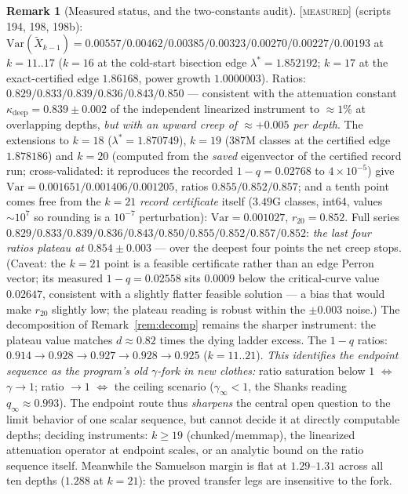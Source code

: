 \documentclass[11pt]{article}
\theoremstyle{definition}
\newtheorem{remark}[theorem]{Remark}
\newcommand{\MEASURED}{\textup{[\textsc{measured}]}}
\newcommand{\Var}{\mathrm{Var}}
\newcommand{\lam}{\lambda}
\begin{document}
\begin{remark}[Measured status, and the two-constants audit]
\label{rem:twoconstants}
\MEASURED{} (scripts 194, 198, 198b): $\Var(\tilde X_{k-1}) =
0.00557/0.00462/0.00385/0.00323/0.00270/0.00227/0.00193$ at
$k = 11..17$ ($k{=}16$ at the cold-start bisection edge
$\lam^* = 1.852192$; $k{=}17$ at the exact-certified edge $1.86168$,
power growth $1.0000003$). Ratios: $0.829/0.833/0.839/0.836/0.843/0.850$
--- consistent with the attenuation constant
$\kappa_{\mathrm{deep}} = 0.839 \pm 0.002$ of the independent linearized
instrument \cite{G1} to $\approx 1\%$ at overlapping depths, \emph{but
with an upward creep of $\approx +0.005$ per depth}. The extensions to $k = 18$ ($\lam^* = 1.870749$), $k = 19$ ($387$M
classes at the certified edge $1.878186$) and $k = 20$ (computed from
the \emph{saved} eigenvector of the certified record run;
cross-validated: it reproduces the recorded $1 - q = 0.02768$ to
$4\times 10^{-5}$) give $\Var = 0.001651/0.001406/0.001205$, ratios $0.855/0.852/0.857$;
and a tenth point comes free from the $k{=}21$ \emph{record
certificate} itself ($3.49$G classes, int64, values $\sim 10^7$ so
rounding is a $10^{-7}$ perturbation): $\Var = 0.001027$,
$r_{20} = 0.852$. Full series
$0.829/0.833/0.839/0.836/0.843/0.850/0.855/0.852/0.857/0.852$:
\emph{the last four ratios plateau at $0.854 \pm 0.003$} --- over the
deepest four points the net creep stops. (Caveat: the $k{=}21$ point is
a feasible certificate rather than an edge Perron vector; its measured
$1-q = 0.02558$ sits $0.0009$ below the critical-curve value $0.02647$,
consistent with a slightly flatter feasible solution --- a bias that
would make $r_{20}$ slightly low; the plateau reading is robust within
the $\pm 0.003$ noise.) The decomposition of Remark~\ref{rem:decomp}
remains the sharper instrument: the plateau value matches
$d \approx 0.82$ times the dying ladder excess. The $1-q$ ratios:
$0.914 \to 0.928 \to 0.927 \to 0.928 \to 0.925$ ($k=11..21$). \emph{This identifies the endpoint sequence as the
program's old $\gamma$-fork in new clothes:} ratio saturation below $1$
$\Leftrightarrow$ $\gamma \to 1$; ratio $\to 1$ $\Leftrightarrow$ the
ceiling scenario ($\gamma_\infty < 1$, the Shanks reading
$q_\infty \approx 0.993$). The endpoint route thus \emph{sharpens} the
central open question to the limit behavior of one scalar sequence, but
cannot decide it at directly computable depths; deciding instruments:
$k \ge 19$ (chunked/memmap), the linearized attenuation operator at
endpoint scales, or an analytic bound on the ratio sequence itself.
Meanwhile the Samuelson margin is flat at $1.29$--$1.31$ across all ten
depths ($1.288$ at $k{=}21$): the proved transfer legs are insensitive
to the fork.
\end{remark}
\end{document}
